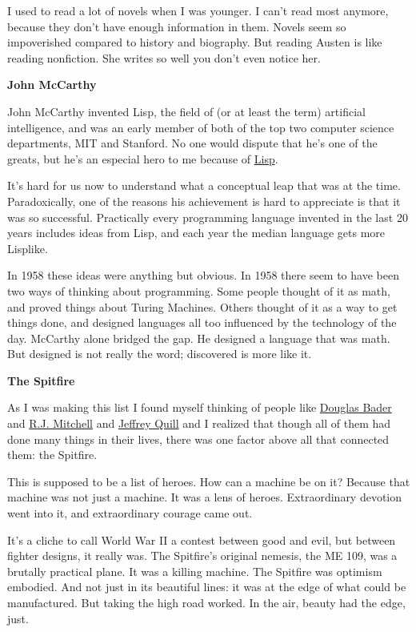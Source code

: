 \documentclass[12pt]{book}
\begin{document}
I used to read a lot of novels when I was younger. I can't read most
anymore, because they don't have enough information in them. Novels seem
so impoverished compared to history and biography. But reading Austen is
like reading nonfiction. She writes so well you don't even notice her.

\textbf{John McCarthy}

John McCarthy invented Lisp, the field of (or at least the term)
artificial intelligence, and was an early member of both of the top two
computer science departments, MIT and Stanford. No one would dispute
that he's one of the greats, but he's an especial hero to me because of
\href{rootsoflisp.html}{Lisp}.

It's hard for us now to understand what a conceptual leap that was at
the time. Paradoxically, one of the reasons his achievement is hard to
appreciate is that it was so successful. Practically every programming
language invented in the last 20 years includes ideas from Lisp, and
each year the median language gets more Lisplike.

In 1958 these ideas were anything but obvious. In 1958 there seem to
have been two ways of thinking about programming. Some people thought of
it as math, and proved things about Turing Machines. Others thought of
it as a way to get things done, and designed languages all too
influenced by the technology of the day. McCarthy alone bridged the gap.
He designed a language that was math. But designed is not really the
word; discovered is more like it.

\textbf{The Spitfire}

As I was making this list I found myself thinking of people like
\href{http://en.wikipedia.org/wiki/Douglas_Bader}{Douglas Bader} and
\href{http://en.wikipedia.org/wiki/R._J._Mitchell}{R.J. Mitchell} and
\href{http://www.amazon.com/Spitfire-Pilots-Story-Crecy-Cover/dp/0947554726}{Jeffrey
Quill} and I realized that though all of them had done many things in
their lives, there was one factor above all that connected them: the
Spitfire.

This is supposed to be a list of heroes. How can a machine be on it?
Because that machine was not just a machine. It was a lens of heroes.
Extraordinary devotion went into it, and extraordinary courage came out.

It's a cliche to call World War II a contest between good and evil, but
between fighter designs, it really was. The Spitfire's original nemesis,
the ME 109, was a brutally practical plane. It was a killing machine.
The Spitfire was optimism embodied. And not just in its beautiful lines:
it was at the edge of what could be manufactured. But taking the high
road worked. In the air, beauty had the edge, just.
\end{document}
